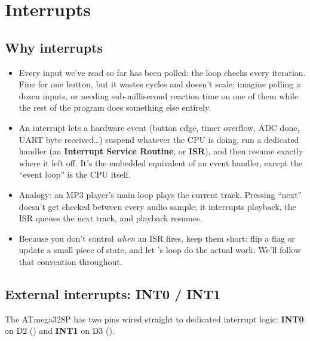 
\section{Interrupts}
\label{c3:sec:interrupts}\label{c3:app:a}

\subsection{Why interrupts}
\label{c3:a:1}
\begin{itemize}
  \item Every input we've read so far has been polled: the  loop checks
     every iteration. Fine for one button, but it wastes cycles and doesn't
    scale; imagine polling a dozen inputs, or needing sub-millisecond reaction time on one of them
    while the rest of the program does something else entirely.
  \item An interrupt lets a hardware event (button edge, timer overflow, ADC done, UART byte
    received\ldots) suspend whatever the CPU is doing, run a dedicated handler (an
    \textbf{Interrupt Service Routine}, or \textbf{ISR}), and then resume exactly where it left
    off. It's the embedded equivalent of an event handler, except the ``event loop'' is the CPU
    itself.
  \item Analogy: an MP3 player's main loop plays the current track. Pressing ``next'' doesn't get
    checked between every audio sample; it interrupts playback, the ISR queues the next track, and
    playback resumes.
  \item Because you don't control \emph{when} an ISR fires, keep them short: flip a flag or update
    a small piece of state, and let 's loop do the actual work. We'll follow that
    convention throughout.
\end{itemize}

\subsection{External interrupts: INT0 / INT1}
\label{c3:a:2}
The ATmega328P has two pins wired straight to dedicated interrupt logic: \textbf{INT0} on D2
() and \textbf{INT1} on D3 ().

